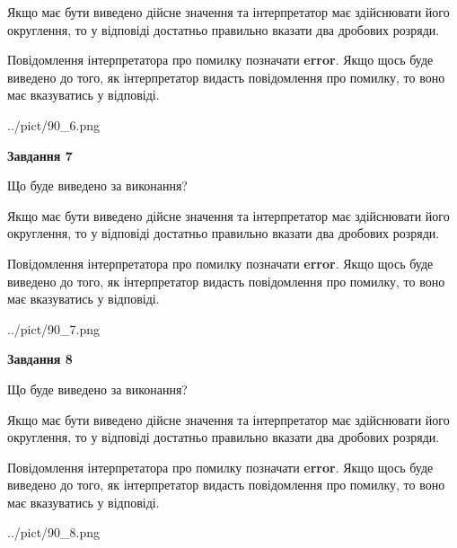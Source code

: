 \documentclass[12pt, ukrainian]{article}
\begin{document}
{\begin {Large}
Якщо має бути виведено дійсне значення та інтерпретатор має здійснювати його округлення, 
то у відповіді достатньо правильно вказати два дробових розряди.

Повідомлення інтерпретатора про помилку позначати \textbf{error}.
Якщо щось буде виведено до того, як інтерпретатор видасть повідомлення про помилку, 
то воно має вказуватись у відповіді. \par

\begin{center}
	{../pict/90_6.png}
\end{center}
\newpage

{\begin {center}\textbf{Завдання 7}\end {center}}\par
Що буде виведено за виконання? \par

Якщо має бути виведено дійсне значення та інтерпретатор має здійснювати його округлення, 
то у відповіді достатньо правильно вказати два дробових розряди.

Повідомлення інтерпретатора про помилку позначати \textbf{error}.
Якщо щось буде виведено до того, як інтерпретатор видасть повідомлення про помилку, 
то воно має вказуватись у відповіді. \par

\begin{center}
	{../pict/90_7.png}
\end{center}
\newpage

{\begin {center}\textbf{Завдання 8}\end {center}}\par
Що буде виведено за виконання? \par

Якщо має бути виведено дійсне значення та інтерпретатор має здійснювати його округлення, 
то у відповіді достатньо правильно вказати два дробових розряди.

Повідомлення інтерпретатора про помилку позначати \textbf{error}.
Якщо щось буде виведено до того, як інтерпретатор видасть повідомлення про помилку, 
то воно має вказуватись у відповіді. \par

\begin{center}
	{../pict/90_8.png}
\end{center}
\newpage


\end{Large}}
\end{document}
